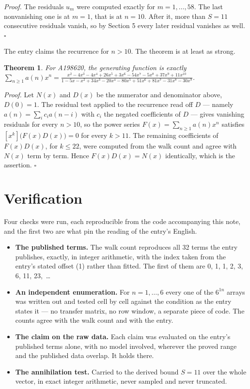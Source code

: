 \documentclass[11pt]{article}
\newtheorem{theorem}{Theorem}
\theoremstyle{definition}
\begin{document}
{\itshape Proof.} The residuals $u_m$ were computed exactly for $m = 1,\dots,58$. The last nonvanishing one is at $m = 1$, that is at $n = 10$. After it, more than $S = 11$ consecutive residuals vanish, so by Section 5 every later residual vanishes as well. $\square$

The entry claims the recurrence for $n > 10$. The theorem is at least as strong.

\begin{theorem} For A198620, the generating function is exactly $\sum_{n\ge 1} a(n)x^n = \frac{x^{2} - 4x^{3} - 4x^{4} + 26x^{5} + 3x^{6} - 54x^{7} - 5x^{8} + 37x^{9} + 11x^{10}}{1 - 5x - x^{2} + 34x^{3} - 20x^{4} - 80x^{5} + 51x^{6} + 81x^{7} - 31x^{8} - 30x^{9}}$.\end{theorem}

{\itshape Proof.} Let $N(x)$ and $D(x)$ be the numerator and denominator above, $D(0)=1$. The residual test applied to the recurrence read off $D$ --- namely $a(n) = \sum_i c_i a(n-i)$ with $c_i$ the negated coefficients of $D$ --- gives vanishing residuals for every $n > 10$, so the power series $F(x)=\sum_{n\ge 1}a(n)x^n$ satisfies $[x^k]\bigl(F(x)D(x)\bigr) = 0$ for every $k > 11$. The remaining coefficients of $F(x)D(x)$, for $k \le 22$, were computed from the walk count and agree with $N(x)$ term by term. Hence $F(x)D(x) = N(x)$ identically, which is the assertion. $\square$

\section{Verification}

Four checks were run, each reproducible from the code accompanying this note, and the first two are what pin the reading of the entry's English.

\begin{itemize}

\item {\bfseries The published terms.} The walk count reproduces all 32 terms the entry publishes, exactly, in integer arithmetic, with the index taken from the entry's stated offset (1) rather than fitted. The first of them are 0, 1, 1, 2, 3, 6, 11, 23,~\dots

\item {\bfseries An independent enumeration.} For $n = 1,\dots,6$ every one of the $6^{1n}$ arrays was written out and tested cell by cell against the condition as the entry states it --- no transfer matrix, no row window, a separate piece of code. The counts agree with the walk count and with the entry.

\item {\bfseries The claim on the raw data.} Each claim was evaluated on the entry's published terms alone, with no model involved, wherever the proved range and the published data overlap. It holds there.

\item {\bfseries The annihilation test.} Carried to the derived bound $S = 11$ over the whole vector, in exact integer arithmetic, never sampled and never truncated.

\end{itemize}
\end{document}
